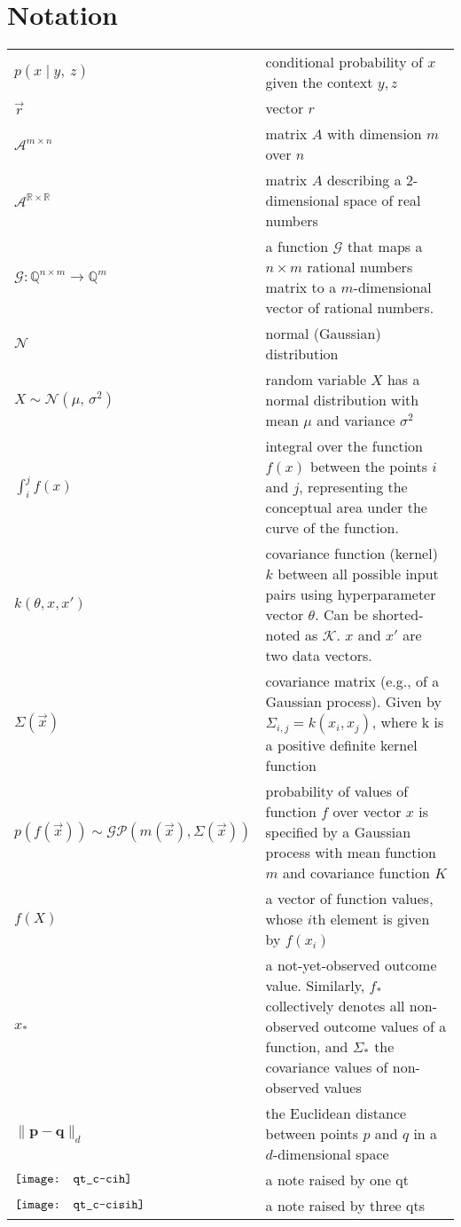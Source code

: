 \section*{Notation}
\begin{tabularx}{\linewidth}{l@{\quad}X}
	$p(x \mid y,\ z)$ & conditional probability of $x$ given the context ${y, z}$\\
	$\vec{r}$ & vector $r$ \\
	$\mathcal{A}^{m \times n}$ & matrix $A$ with dimension $m$ over $n$ \\
	$\mathcal{A}^{\mathbb{R} \times \mathbb{R}}$ & matrix $A$ describing a 2-dimensional space of real numbers \\
	$\mathcal{G}: \mathbb{Q}^{n \times m} \longrightarrow \mathbb{Q}^{m}$ & a function $\mathcal{G}$ that maps a $n \times m$ rational numbers matrix to a $m$-dimensional vector of rational numbers.\\
	$\mathcal{N}$ 	&	normal (Gaussian) distribution \\
	$X \sim \mathcal{N}(\mu,\,\sigma^{2})$	&	random variable $X$ has a normal distribution with mean $\mu$ and variance $\sigma^{2}$ \\
	$\int_{i}^{j}f(x)$ & integral over the function $f(x)$ between the points $i$ and $j$, representing the conceptual area under the curve of the function.\\
	$k\left( \theta, x, x' \right)$ & covariance function (kernel) $k$ between all possible input pairs using hyperparameter vector $\theta$. Can be shorted-noted as $\mathcal{K}$. $x$ and $x'$ are two data vectors. \\
	$\Sigma(\vec{x})$	&	covariance matrix (e.g., of a Gaussian process). Given by $\Sigma_{i,j} = k(x_i, x_j)$, where k is a positive definite kernel function \\
	$p\left( f \left( \vec{x} \right) \right) \sim \mathcal{GP}\left( m(\vec{x}), \Sigma(\vec{x}) \right)$	&	probability of values of function $f$ over vector $x$ is specified by a Gaussian process with mean function $m$ and covariance function $K$ \\
	$f(X)$	&	a vector of function values, whose $i$th element is given by $f(x_i)$ \\
	$x_*$	&	a not-yet-observed outcome value. Similarly, $f_*$ collectively denotes all non-observed outcome values of a function, and $\Sigma_*$ the covariance values of non-observed values \\
	$\lVert \mathbf{p - q} \rVert_d$ & the Euclidean distance between points $p$ and $q$ in a $d$-dimensional space\\
	$\vcenter{\hbox{\texttt{[image: qt\_c-cih]}}}$	& a note raised by one \acl{qt}\\
	$\vcenter{\hbox{\texttt{[image: qt\_c-cisih]}}}$	& a note raised by three \aclp{qt}\\
\end{tabularx}
  	
